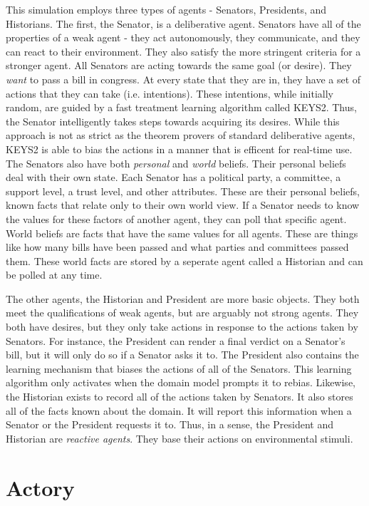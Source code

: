 \documentclass{sig-alternate}
\newcounter{over}
\begin{document}
This simulation employs three types of agents - Senators, Presidents, 
and Historians. The first, the Senator, is a deliberative agent. Senators
have all of the properties of a weak agent - they act autonomously, they communicate, and they can react to their environment. They
also satisfy the more stringent criteria for a stronger agent. All
Senators are acting towards the same goal (or desire). They {\em want}
to pass a bill in congress. At every state that they are in, they have
a set of actions that they can take (i.e. intentions). These 
intentions, while initially random, are guided by a fast treatment 
learning algorithm called KEYS2. Thus, the Senator intelligently
takes steps towards acquiring its desires. While this approach
is not as strict as the theorem provers of standard deliberative
agents, KEYS2 is able to bias the actions in a manner that is efficent
for real-time use. The Senators also have 
both {\em personal} and {\em world} beliefs. Their personal beliefs deal
with their own state. Each Senator has a political party, a committee, a
support level, a trust level, and other attributes. These are their 
personal beliefs, known facts that relate only to their own world view.
If a Senator needs to know the values for these factors of another agent,
they can poll that specific agent. World beliefs are facts that have
the same values for all agents. These are things like how many bills 
have been passed and what parties and committees passed them. These 
world facts are stored by a seperate agent called a Historian and can
be polled at any time. 

The other agents, the Historian and President are more basic objects.
They both meet the qualifications of weak agents, but are arguably
not strong agents. They both have desires, but they only take actions
in response to the actions taken by Senators. For instance, the President
can render a final verdict on a Senator's bill, but it will only do so
if a Senator asks it to. The President also contains the learning 
mechanism that biases the actions of all of the Senators. This learning
algorithm only activates when the domain model prompts it to rebias. 
Likewise, the Historian exists to record all of the actions taken by
Senators. It also stores all of the facts known about the domain. It
will report this information when a Senator or the President requests it
to. Thus, in a sense, the President and Historian are {\em reactive agents}. 
They base their actions on environmental stimuli. 

\section{Actory}
\end{document}
